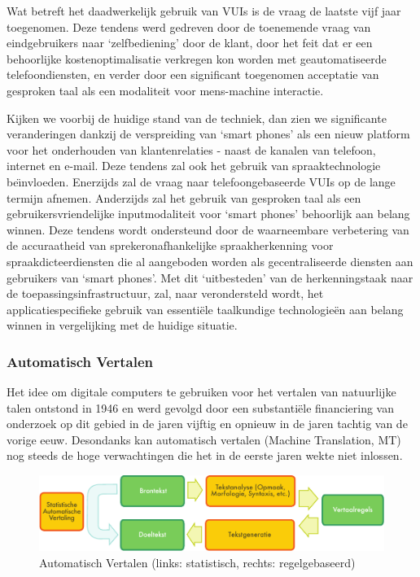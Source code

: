 \begin{multicols}{2}
    Wat betreft het daadwerkelijk gebruik van VUIs is de vraag de laatste vijf jaar toegenomen. Deze tendens werd gedreven door de toenemende vraag van eindgebruikers naar `zelfbediening' door de klant, door het feit dat er een behoorlijke kostenoptimalisatie verkregen kon worden met geautomatiseerde telefoondiensten, en verder door een significant toegenomen acceptatie van gesproken taal als een modaliteit voor mens-machine interactie.

    Kijken we voorbij de huidige stand van de techniek, dan zien we significante veranderingen dankzij de verspreiding van `smart phones' als een nieuw platform voor het onderhouden van klantenrelaties - naast de kanalen van telefoon, internet en e-mail. Deze tendens zal ook het gebruik van spraaktechnologie be{\"\i}nvloeden. Enerzijds zal de vraag naar telefoongebaseerde VUIs op de lange termijn afnemen. Anderzijds zal het gebruik van gesproken taal als een gebruikersvriendelijke inputmodaliteit voor `smart phones' behoorlijk aan belang winnen. Deze tendens wordt ondersteund door de waarneembare verbetering van de accuraatheid van sprekeronafhankelijke spraakherkenning voor spraakdicteerdiensten die al aangeboden worden als gecentraliseerde diensten aan gebruikers van `smart phones'. Met dit `uitbesteden' van de herkenningstaak naar de toepassingsinfrastructuur, zal, naar verondersteld wordt, het applicatiespecifieke gebruik van essenti{\"e}le taalkundige technologie{\"e}n aan belang winnen in vergelijking met de huidige situatie.

\subsubsection{Automatisch Vertalen}

  Het idee om digitale computers te gebruiken voor het vertalen van natuurlijke talen ontstond in 1946  en werd gevolgd door een substanti{\"e}le financiering van onderzoek op dit gebied in de jaren vijftig en opnieuw in de jaren tachtig van de vorige eeuw. Desondanks kan automatisch vertalen (Machine Translation, MT) nog steeds de hoge verwachtingen die het in de eerste jaren wekte niet inlossen.

\begin{figure}[htb]
  \center
  \includegraphics[width=\textwidth]{../_media/dutch/machine_translation}
  \vspace{-2mm}
  \caption{Automatisch Vertalen (links: statistisch, rechts: regelgebaseerd)}
  \label{fig:mtarch_de}
\end{figure}


\end{multicols}
